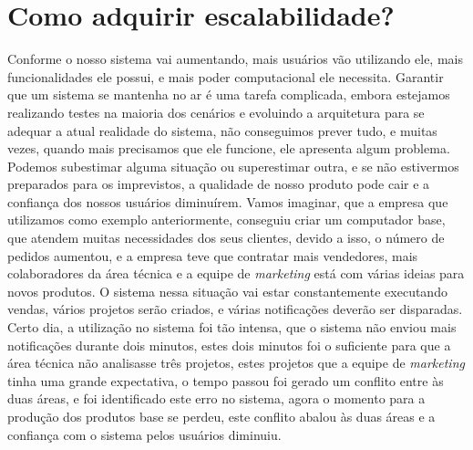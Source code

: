   \chapter{Como adquirir escalabilidade?}
    Conforme o nosso sistema vai aumentando, mais usuários vão utilizando ele,
    mais funcionalidades ele possui, e mais poder computacional ele necessita.
    Garantir que um sistema se mantenha no ar é uma tarefa complicada, embora
    estejamos realizando testes na maioria dos cenários e evoluindo a arquitetura
    para se adequar a atual realidade do sistema, não conseguimos prever tudo, e
    muitas vezes, quando mais precisamos que ele funcione, ele apresenta algum
    problema. Podemos subestimar alguma situação ou superestimar outra, e se não
    estivermos preparados para os imprevistos, a qualidade de nosso produto pode
    cair e a confiança dos nossos usuários diminuírem. \newline
    Vamos imaginar, que a empresa que utilizamos como exemplo anteriormente,
    conseguiu criar um computador base, que atendem muitas necessidades dos seus
    clientes, devido a isso, o número de pedidos aumentou, e a empresa teve que
    contratar mais vendedores, mais colaboradores da área técnica e a equipe de
    \textit{marketing} está com várias ideias para novos produtos. O sistema
    nessa situação vai estar constantemente executando vendas, vários projetos
    serão criados, e várias notificações deverão ser disparadas. Certo dia, a
    utilização no sistema foi tão intensa, que o sistema não enviou mais notificações
    durante dois minutos, estes dois minutos foi o suficiente para que a área
    técnica não analisasse três projetos, estes projetos que a equipe de
    \textit{marketing} tinha uma grande expectativa, o tempo passou foi gerado
    um conflito entre às duas áreas, e foi identificado este erro no sistema,
    agora o momento para a produção dos produtos base se perdeu, este conflito
    abalou às duas áreas e a confiança com o sistema pelos usuários diminuiu.

